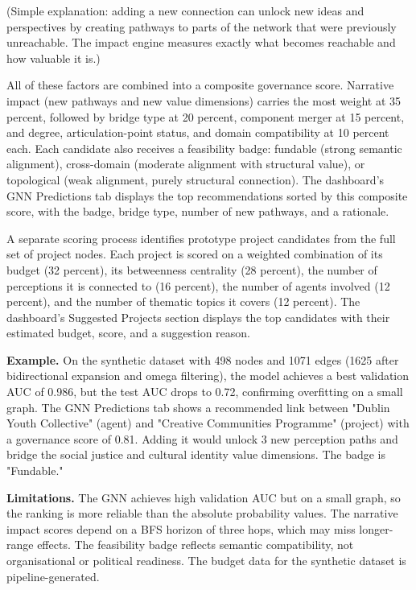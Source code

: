 \documentclass[11pt,a4paper]{article}
\begin{document}
(Simple explanation: adding a new connection can unlock new ideas and
perspectives by creating pathways to parts of the network that were
previously unreachable. The impact engine measures exactly what becomes
reachable and how valuable it is.)

All of these factors are combined into a composite governance score.
Narrative impact (new pathways and new value dimensions) carries the
most weight at 35 percent, followed by bridge type at 20 percent,
component merger at 15 percent, and degree, articulation-point status,
and domain compatibility at 10 percent each. Each candidate also
receives a feasibility badge: fundable (strong semantic alignment),
cross-domain (moderate alignment with structural value), or topological
(weak alignment, purely structural connection). The dashboard's GNN
Predictions tab displays the top recommendations sorted by this
composite score, with the badge, bridge type, number of new pathways,
and a rationale.

A separate scoring process identifies prototype project candidates from
the full set of project nodes. Each project is scored on a weighted
combination of its budget (32 percent), its betweenness centrality (28
percent), the number of perceptions it is connected to (16 percent), the
number of agents involved (12 percent), and the number of thematic
topics it covers (12 percent). The dashboard's Suggested Projects
section displays the top candidates with their estimated budget, score,
and a suggestion reason.

\textbf{Example.} On the synthetic dataset with 498 nodes and 1071 edges (1625
after bidirectional expansion and omega filtering), the model achieves a
best validation AUC of 0.986, but the test AUC drops to 0.72, confirming
overfitting on a small graph. The GNN Predictions tab shows a recommended
link between "Dublin Youth Collective" (agent) and "Creative Communities
Programme" (project) with a governance score of 0.81. Adding it would
unlock 3 new perception paths and bridge the social justice and cultural
identity value dimensions. The badge is "Fundable."

\textbf{Limitations.} The GNN achieves high validation AUC but on a small
graph, so the ranking is more reliable than the absolute probability
values. The narrative impact scores depend on a BFS horizon of three
hops, which may miss longer-range effects. The feasibility badge reflects
semantic compatibility, not organisational or political readiness. The
budget data for the synthetic dataset is pipeline-generated.
\end{document}
